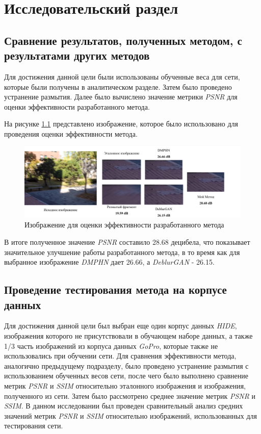 \chapter{Исследовательский раздел}

\section{Сравнение результатов, полученных методом, с результатами других методов}

Для достижения данной цели были использованы обученные веса для сети, которые были получены в аналитическом разделе. Затем было проведено устранение размытия. Далее было вычислено значение метрики \textit{PSNR} для оценки эффективности разработанного метода.

На рисунке \ref{fig:comparation} представлено изображение, которое было использовано для проведения оценки эффективности метода.
\begin{figure}[H]
    \centering
    \includegraphics[width=1.0\textwidth]{assets/comparation.png}
    \caption{Изображение для оценки эффективности разработанного метода}
    \label{fig:comparation}
\end{figure}

В итоге полученное значение \textit{PSNR} составило 28.68 децибела, что показывает значительное улучшение работы разработанного метода, в то время как для выбранное изображение \textit{DMPHN} дает 26.66, а \textit{DeblurGAN} - 26.15.

\section{Проведение тестирования метода на корпусе данных}

Для достижения данной цели был выбран еще один корпус данных \textit{HIDE}, изображения которого не присутствовали в обучающем наборе данных, а также 1/3 часть изображений из корпуса данных \textit{GoPro}, которые также не использовались при обучении сети. Для сравнения эффективности метода, аналогично предыдущему подразделу, было проведено устранение размытия с использованием обученных весов сети, после чего было выполнено сравнение метрик \textit{PSNR} и \textit{SSIM} относительно эталонного изображения и изображения, полученного из сети. Затем было рассмотрено среднее значение метрик \textit{PSNR} и \textit{SSIM}. В данном исследовании был проведен сравнительный анализ средних значений метрик \textit{PSNR} и \textit{SSIM} относительно изображений, использованных для тестирования сети.

